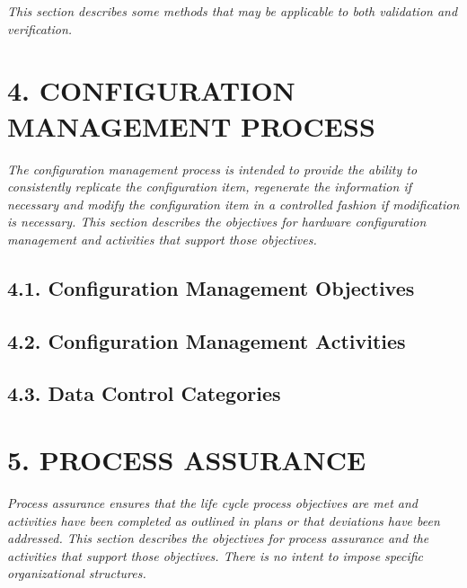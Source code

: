 \documentclass[
]{article}
\begin{document}
\emph{This section describes some methods that may be applicable to both
validation and verification.}

\hypertarget{configuration-management-process}{%
\section{4. CONFIGURATION MANAGEMENT
PROCESS}\label{configuration-management-process}}

\emph{The configuration management process is intended to provide the
ability to consistently replicate the configuration item, regenerate the
information if necessary and modify the configuration item in a
controlled fashion if modification is necessary. This section describes
the objectives for hardware configuration management and activities that
support those objectives.}

\hypertarget{configuration-management-objectives}{%
\subsection{4.1. Configuration Management
Objectives}\label{configuration-management-objectives}}

\hypertarget{configuration-management-activities}{%
\subsection{4.2. Configuration Management
Activities}\label{configuration-management-activities}}

\hypertarget{data-control-categories}{%
\subsection{4.3. Data Control
Categories}\label{data-control-categories}}

\hypertarget{process-assurance}{%
\section{5. PROCESS ASSURANCE}\label{process-assurance}}

\emph{Process assurance ensures that the life cycle process objectives
are met and activities have been completed as outlined in plans or that
deviations have been addressed. This section describes the objectives
for process assurance and the activities that support those objectives.
There is no intent to impose specific organizational structures.}
\end{document}
